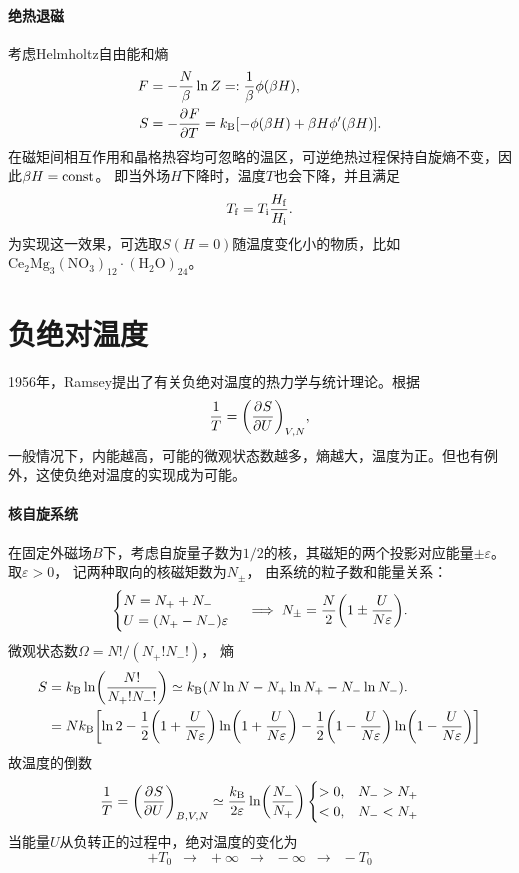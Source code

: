\paragraph{绝热退磁}

考虑Helmholtz自由能和熵
\begin{align*}
	F &= -\frac N\beta\ln Z =: \frac1\beta\phi(\beta H),\\
	S &= -\frac{\partial^{}F}{\partial{T}^{}} = k_{\mathrm{B}}[-\phi(\beta H) + \beta H\phi'(\beta H)].
\end{align*}
在磁矩间相互作用和晶格热容均可忽略的温区，可逆绝热过程保持自旋熵不变，因此$\beta H = \mathrm{const}$。
即当外场$H$下降时，温度$T$也会下降，并且满足
\begin{equation}
	\label{eq:sm-adiabatic-demagnetization}
	T_\mathrm f = T_\mathrm i\frac{H_\mathrm f}{H_\mathrm i}.
\end{equation}
为实现这一效果，可选取$S(H = 0)$随温度变化小的物质，比如$\mathrm{Ce_2Mg_3(NO_3)_{12}\cdot(H_2O)_{24}}$。

\section{负绝对温度}

1956年，Ramsey提出了有关负绝对温度的热力学与统计理论。根据
\[
	\frac1T = \biggl(\frac{\partial^{}S}{\partial{U}^{}}\biggr)_{V,N},
\]
一般情况下，内能越高，可能的微观状态数越多，熵越大，温度为正。但也有例外，这使负绝对温度的实现成为可能。

\paragraph{核自旋系统}

在固定外磁场$B$下，考虑自旋量子数为$1/2$的核，其磁矩的两个投影对应能量$\pm\varepsilon$。取$\varepsilon > 0$，
记两种取向的核磁矩数为$N_\pm$，
由系统的粒子数和能量关系：
\[
	\begin{cases}
		N = N_+ + N_- \\
		U = (N_+ - N_-)\varepsilon
	\end{cases}
	\implies
	N_\pm = \frac N2\biggl(1 \pm \frac U{N\varepsilon}\biggr).
\]
微观状态数$\Omega = N!/(N_+!N_-!)$，
熵
\begin{align*}
	S & = k_{\mathrm{B}}\ln\biggl(\frac{N!}{N_+!N_-!}\biggr) \simeq k_{\mathrm{B}}(N\ln N - N_+\ln N_+ - N_-\ln N_-).
	  \\ & = Nk_{\mathrm{B}}\biggl[\ln 2 - \frac12\biggl(1 + \frac U{N\varepsilon}\biggr)\ln\biggl(1 + \frac U{N\varepsilon}\biggr) - \frac12\biggl(1 - \frac U{N\varepsilon}\biggr)\ln\biggl(1 - \frac U{N\varepsilon}\biggr)\biggr]
\end{align*}
故温度的倒数
\begin{equation}
	\frac1T = \biggl(\frac{\partial^{}S}{\partial{U}^{}}\biggr)_{B,V,N} \simeq \frac{k_{\mathrm{B}}}{2\varepsilon}\ln\biggl(\frac{N_-}{N_+}\biggr)
	\begin{cases}
		> 0,&N_- > N_+\\
		< 0,&N_- < N_+
	\end{cases}
\end{equation}
当能量$U$从负转正的过程中，绝对温度的变化为
\[
	+T_0\enspace \longrightarrow \enspace +\infty\enspace \to \enspace -\infty\enspace \longrightarrow \enspace -T_0
\]
\begin{notecaptionblock}
\end{notecaptionblock}

